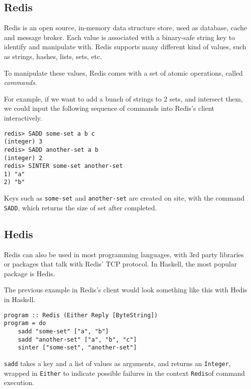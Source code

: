 \documentclass[pldi]{sigplanconf-pldi16}
\begin{document}
\subsection{Redis}

Redis is an open source, in-memory data structure store, used as
 database, cache and message broker. Each value is associated with a binary-safe
 string key to identify and manipulate with. Redis supports many different
 kind of values, such as strings, hashes, lists, sets, etc.

To manipulate these values, Redis comes with a set of atomic operations, called
 \emph{commands}.

For example, if we want to add a bunch of strings to 2 sets, and intersect them,
 we could input the following sequence of commands into Redis's client
 interactively.

\begin{verbatim}
redis> SADD some-set a b c
(integer) 3
redis> SADD another-set a b
(integer) 2
redis> SINTER some-set another-set
1) "a"
2) "b"
\end{verbatim}

Keys such as \texttt{some-set} and \texttt{another-set}
 are created on site, with the command \texttt{SADD}, which returns
 the size of set after completed.

\subsection{Hedis}
Redis can also be used in most programming languages, with 3rd party libraries
 or packages that talk with Redis' TCP protocol. In Haskell, the most popular
 package is Hedis.

The previous example in Redis's client would look something like this with
 Hedis in Haskell.

\begin{verbatim}
program :: Redis (Either Reply [ByteString])
program = do
    sadd "some-set" ["a", "b"]
    sadd "another-set" ["a", "b", "c"]
    sinter ["some-set", "another-set"]
\end{verbatim}

\texttt{sadd} takes a key and a list of values as arguments, and
 returns an \texttt{Integer}, wrapped in
 \texttt{Either} to indicate possible failures in the context
 \texttt{Redis}\footnotemark of command execution.
\end{document}
